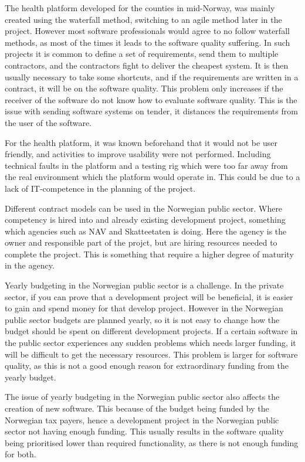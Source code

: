 The health platform developed for the counties in mid-Norway, was mainly created using the waterfall method, switching to an agile method later in the project. However most software professionals would agree to no follow waterfall methods, as most of the times it leads to the software quality suffering. In such projects it is common to define a set of requirements, send them to multiple contractors, and the contractors fight to deliver the cheapest system. It is then usually necessary to take some shortcuts, and if the requirements are written in a contract, it will be on the software quality. This problem only increases if the receiver of the software do not know how to evaluate software quality. This is the issue with sending software systems on tender, it distances the requirements from the user of the software.

For the health platform, it was known beforehand that it would not be user friendly, and activities to improve usability were not performed. Including technical faults in the platform and a testing rig which were too far away from the real environment which the platform would operate in. This could be due to a lack of IT-competence in the planning of the project.

Different contract models can be used in the Norwegian public sector. Where competency is hired into and already existing development project, something which agencies such as NAV and Skatteetaten is doing. Here the agency is the owner and responsible part of the projct, but are hiring resources needed to complete the project. This is something that require a higher degree of maturity in the agency.

Yearly budgeting in the Norwegian public sector is a challenge. In the private sector, if you can prove that a development project will be beneficial, it is easier to gain and spend money for that develop project. However in the Norwegian public sector budgets are planned yearly, so it is not easy to change how the budget should be spent on different development projects. If a certain software in the public sector experiences any sudden problems which needs larger funding, it will be difficult to get the necessary resources. This problem is larger for software quality, as this is not a good enough reason for extraordinary funding from the yearly budget. 

The issue of yearly budgeting in the Norwegian public sector also affects the creation of new software. This because of the budget being funded by the Norwegian tax payers, hence a development project in the Norwegian public sector not having enough funding. This usually results in the software quality being prioritised lower than required functionality, as there is not enough funding for both.

